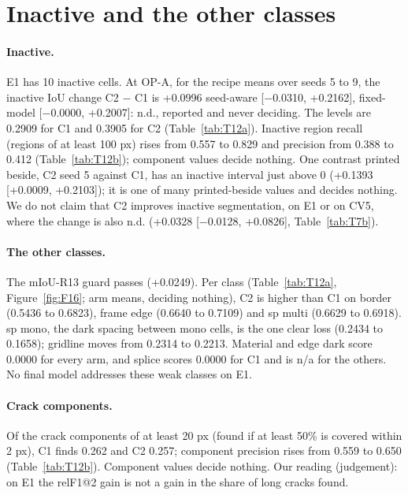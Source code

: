 \section{Inactive and the other classes}\label{sec:e1-classes}

\paragraph{Inactive.} E1 has 10 inactive cells. At OP-A, for the recipe means over seeds 5 to 9, the inactive IoU change C2 $-$ C1 is +0.0996 seed-aware [$-$0.0310, +0.2162],
fixed-model [$-$0.0000, +0.2007]: n.d., reported and never deciding. The levels are 0.2909 for C1 and 0.3905 for C2
(Table~\ref{tab:T12a}). Inactive region recall (regions of at least 100 px) rises from 0.557 to 0.829 and precision from 0.388
to 0.412 (Table~\ref{tab:T12b}); component values decide nothing. One contrast printed beside, C2 seed 5 against C1, has an
inactive interval just above 0 (+0.1393 [+0.0009, +0.2103]); it is one of many printed-beside values and decides nothing. We do
not claim that C2 improves inactive segmentation, on E1 or on CV5, where the change is also n.d. (+0.0328 [$-$0.0128, +0.0826],
Table~\ref{tab:T7b}).

\paragraph{The other classes.} The mIoU-R13 guard passes (+0.0249). Per class (Table~\ref{tab:T12a}, Figure~\ref{fig:F16}; arm means,
deciding nothing), C2 is higher than C1 on border (0.5436 to 0.6823), frame edge (0.6640 to 0.7109) and sp multi (0.6629 to
0.6918). sp mono, the dark spacing between mono cells, is the one clear loss (0.2434 to 0.1658); gridline moves from 0.2314 to
0.2213. Material and edge dark score 0.0000 for every arm, and splice scores 0.0000 for C1 and is n/a for the others. No final
model addresses these weak classes on E1.


\paragraph{Crack components.} Of the crack components of at least 20 px (found if at least 50\% is covered within 2 px), C1
finds 0.262 and C2 0.257; component precision rises from 0.559 to 0.650 (Table~\ref{tab:T12b}). Component values decide
nothing. Our reading (judgement): on E1 the relF1@2 gain is not a gain in the share of long cracks found.

